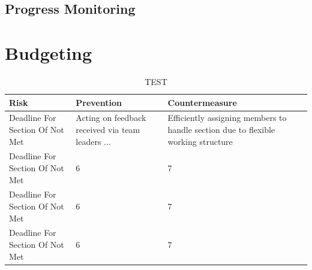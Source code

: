 \documentclass[12pt]{article}
\begin{document}
\subsection*{Progress Monitoring}


\section*{Budgeting}

\begin{table}[ht]
\caption{TEST}
\centering
\begin{tabular}{| p{4cm} | p{5cm} | p{4cm} |}
\hline
Risk & Prevention & Countermeasure \\
\hline
Deadline For Section Of Not Met & Acting on feedback received via team leaders ... & Efficiently assigning members to handle section due to flexible working structure \\
\hline
Deadline For Section Of Not Met & 6 & 7 \\
\hline
Deadline For Section Of Not Met & 6 & 7 \\
\hline
Deadline For Section Of Not Met & 6 & 7 \\
\hline
\end{tabular}
\end{table}

\end{document}
